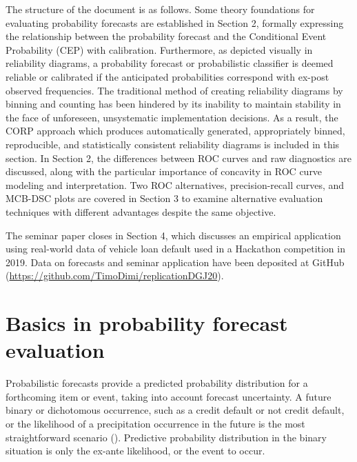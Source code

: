 \documentclass[a4paper,12pt]{article}
\numberwithin{equation}{section}
\begin{document}
The structure of the document is as follows. Some theory foundations for evaluating probability forecasts are established in Section 2, formally expressing the relationship between the probability forecast and the Conditional Event Probability (CEP) with calibration. Furthermore, as depicted visually in reliability diagrams, a probability forecast or probabilistic classifier is deemed reliable or calibrated if the anticipated probabilities correspond with ex-post observed frequencies. The traditional method of creating reliability diagrams by binning and counting has been hindered by its inability to maintain stability in the face of unforeseen, unsystematic implementation decisions. As a result, the CORP approach which produces automatically generated, appropriately binned, reproducible, and statistically consistent reliability diagrams is included in this section. In Section 2, the differences between ROC curves and raw diagnostics are discussed, along with the particular importance of concavity in ROC curve modeling and interpretation. Two ROC alternatives, precision-recall curves, and MCB-DSC plots are covered in Section 3 to examine alternative evaluation techniques with different advantages despite the same objective.\bigskip

The seminar paper closes in Section 4, which discusses an empirical application using real-world data of vehicle loan default used in a Hackathon competition in 2019. Data on forecasts and seminar application have been deposited at GitHub (\url{https://github.com/TimoDimi/replicationDGJ20}).


\section{Basics in probability forecast evaluation}
\label{Chapter:Probability forecast}  

Probabilistic forecasts provide a predicted probability distribution for a forthcoming item or event, taking into account forecast uncertainty. A future binary or dichotomous occurrence, such as a credit default or not credit default, or the likelihood of a precipitation occurrence in the future is the most straightforward scenario (\cite{Forecast2}). Predictive probability distribution in the binary situation is only the ex-ante likelihood, or the event to occur. \bigskip
\end{document}
